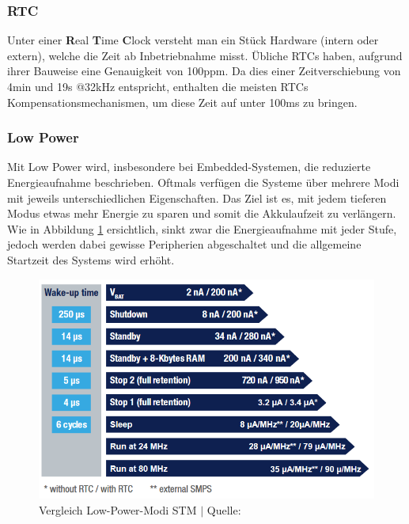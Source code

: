 \documentclass[12pt]{article}
\begin{document}
	\subsubsection*{RTC}
	Unter einer \textbf{R}eal \textbf{T}ime \textbf{C}lock versteht man ein Stück Hardware (intern oder extern), welche die Zeit ab Inbetriebnahme misst. Übliche RTCs haben, aufgrund ihrer Bauweise eine Genauigkeit von 100ppm. Da dies einer Zeitverschiebung von 4min und 19s @32kHz entspricht, enthalten die meisten RTCs Kompensationsmechanismen, um diese Zeit auf unter 100ms zu bringen. \cite{dighe_tps65950_2008}
	\subsubsection*{Low Power}
	Mit Low Power wird, insbesondere bei Embedded-Systemen, die reduzierte Energieaufnahme beschrieben. Oftmals verfügen die Systeme über mehrere Modi mit jeweils unterschiedlichen Eigenschaften. Das Ziel ist es, mit jedem tieferen Modus etwas mehr Energie zu sparen und somit die Akkulaufzeit zu verlängern. Wie in Abbildung  \ref{fig:batlow-power-modestm} ersichtlich, sinkt zwar die Energieaufnahme mit jeder Stufe, jedoch werden dabei gewisse Peripherien abgeschaltet und die allgemeine Startzeit des Systems wird erhöht.
	\begin{figure}[H]
		\centering
		\includegraphics[width=0.7\linewidth]{images/BAT_Low-Power-Mode_STM}
		\caption{Vergleich Low-Power-Modi STM $\vert$ Quelle: \cite{noauthor_stm32l4_2024}}
		\label{fig:batlow-power-modestm}
	\end{figure}
	
\end{document}
